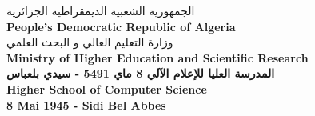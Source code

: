 \begin{titlepage}

\centering
{\arabicfont \normalsize \textsc{الجمهورية الشعبية الديمقراطية الجزائرية}} \\[1mm]
{\normalsize \textbf{People's Democratic Republic of Algeria}} \\[1mm]

{\arabicfont \normalsize \textsc{وزارة التعليم العالي و البحث العلمي}} \\[1mm]
{\normalsize \textbf{Ministry of Higher Education and Scientific Research}}\\

{\arabicfont \normalsize \textbf{المدرسة العليا للإعلام الآلي \hspace{0.3mm} 8 ماي 5491 - سيدي بلعباس}}\\[1mm]
{\normalsize \textbf{Higher School of Computer Science \\[1mm] 8 Mai 1945 - Sidi Bel Abbes}}\\


\vspace{0.5cm}

\begin{figure}[ht]
    \centering
    \hspace{1.5cm}
    \hspace{1.5cm}
\end{figure}




\end{titlepage}
